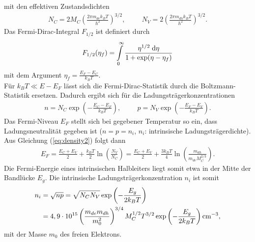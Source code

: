mit den effektiven Zustandsdichten
\begin{align}
N_C=2M_C\left(\frac{2\pi m_{de}k_B T}{h^2}\right)^{3/2},\hspace{1cm}N_V=2\left(\frac{2\pi m_{dh}k_B T}{h^2}\right)^{3/2}.
\end{align}
Das Fermi-Dirac-Integral $F_{1/2}$ ist definiert durch
\begin{align}
F_{1/2}(\eta_f)=\int\limits_0^\infty \frac{\eta^{1/2}\;\mathrm{d} \eta}{1+\exp(\eta-\eta_f)}
\end{align}
mit dem Argument $\eta_f=\frac{E_F-E_C}{k_B T}$.\\
Für $k_B T\ll E-E_F$ lässt sich die Fermi-Dirac-Statistik durch die Boltzmann-Statistik ersetzen. Dadurch ergibt sich für die Ladungsträgerkonzentrationen
\begin{align}
n=N_C\exp\left(-\frac{E_C-E_F}{k_B T}\right),\hspace{1cm} p=N_V\exp\left(-\frac{E_F-E_V}{k_B T}\right).
\label{eq:density2}
\end{align}
Das Fermi-Niveau $E_F$ stellt sich bei gegebener Temperatur so ein, dass Ladungsneutralität gegeben ist ($n=p=n_i$, $n_i$: intrinsische Ladungsträgerdichte).\\
Aus Gleichung (\ref{eq:density2}) folgt dann
\begin{align}
E_F=\frac{E_C+E_V}{2}+\frac{k_B T}{2}\ln\left(\frac{N_V}{N_C}\right)=\frac{E_C+E_V}{2}+\frac{3 k_B T}{4}\ln\left(\frac{m_{dh}}{m_{de}M_C^{2/3}}\right).
\end{align}
Die Fermi-Energie eines intrinsischen Halbleiters liegt somit etwa in der Mitte der Bandlücke $E_g$. Die intrinsische Ladungsträgerkonzentration $n_i$ ist somit
\begin{align}
n_i&=\sqrt{np}=\sqrt{N_C N_V}\exp\left(-\frac{E_g}{2k_B T}\right)\notag\\
&=4,9\cdot 10^{15}\left(\frac{m_{de}m_{dh}}{m_0^2}\right)^{3/4}M_C^{1/2}T^{3/2}\exp\left(-\frac{E_g}{2k_B T}\right)\mathrm{cm}^{-3},
\end{align} 
mit der Masse $m_0$ des freien Elektrons.
